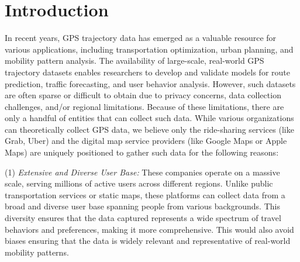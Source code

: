 \documentclass[sigplan,screen]{acmart}
\begin{document}


\maketitle

\section{Introduction}
In recent years, GPS trajectory data has emerged as a valuable 
resource for various applications, 
including transportation optimization, 
urban planning, and mobility pattern analysis. 
The availability of large-scale, real-world GPS trajectory datasets enables 
researchers to develop and validate models for route prediction, 
traffic forecasting, and user behavior analysis.
However, such datasets are often sparse or difficult 
to obtain due to privacy concerns, data collection challenges, and/or regional limitations. 
Because of these limitations, there are only a handful of entities
that can collect such data.
While various organizations can theoretically collect GPS data, 
we believe only the ride-sharing services (like Grab, Uber)
and the digital map service providers (like Google Maps or Apple Maps) 
are uniquely positioned to gather such data
for the following reasons:

(1) \emph{Extensive and Diverse User Base:}
These companies operate on a massive scale, serving millions of active users across different regions. 
Unlike public transportation services or static maps, 
these platforms can collect data from a broad and diverse user base
spanning people from various backgrounds.
This diversity ensures that the data captured represents a wide spectrum of 
travel behaviors and preferences, making it more comprehensive. 
This would also avoid biases ensuring that the data is widely relevant and representative of real-world mobility patterns.
\end{document}
